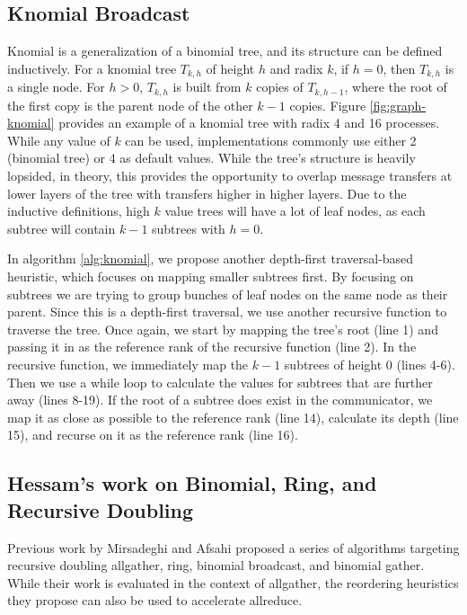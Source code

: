 \subsection{Knomial Broadcast}
Knomial is a generalization of a binomial tree, and its structure can be defined inductively.
For a knomial tree $T_{k,h}$ of height $h$ and radix $k$, if $h=0$, then $T_{k,h}$ is a single node. For $h>0$, $T_{k,h}$ is built from $k$ copies of $T_{k,h-1}$, where the root of the first copy is the parent node of the other $k-1$ copies.
Figure \ref{fig:graph-knomial} provides an example of a knomial tree with radix 4 and 16 processes.
While any value of $k$ can be used, implementations commonly use either 2 (binomial tree) or 4 as default values. 
While the tree's structure is heavily lopsided, in theory, this provides the opportunity to overlap message transfers at lower layers of the tree with transfers higher in higher layers.
Due to the inductive definitions, high $k$ value trees will have a lot of leaf nodes, as each subtree will contain $k-1$ subtrees with $h=0$.

In algorithm \ref{alg:knomial}, we propose another depth-first traversal-based heuristic, which focuses on mapping smaller subtrees first.
By focusing on subtrees we are trying to group bunches of leaf nodes on the same node as their parent.
Since this is a depth-first traversal, we use another recursive function to traverse the tree. 
Once again, we start by mapping the tree's root (line 1) and passing it in as the reference rank of the recursive function (line 2).
In the recursive function, we immediately map the $k-1$ subtrees of height 0 (lines 4-6).
Then we use a while loop to calculate the values for subtrees that are further away (lines 8-19).
If the root of a subtree does exist in the communicator, we map it as close as possible to the reference rank (line 14), calculate its depth (line 15), and recurse on it as the reference rank (line 16).




\subsection{Hessam's work on Binomial, Ring, and Recursive Doubling}

Previous work by Mirsadeghi and Afsahi \cite{Mirsadeghi2016TopoAwareCollRR} proposed a series of algorithms targeting recursive doubling allgather, ring, binomial broadcast, and binomial gather. 
While their work is evaluated in the context of allgather, the reordering heuristics they propose can also be used to accelerate allreduce. 

